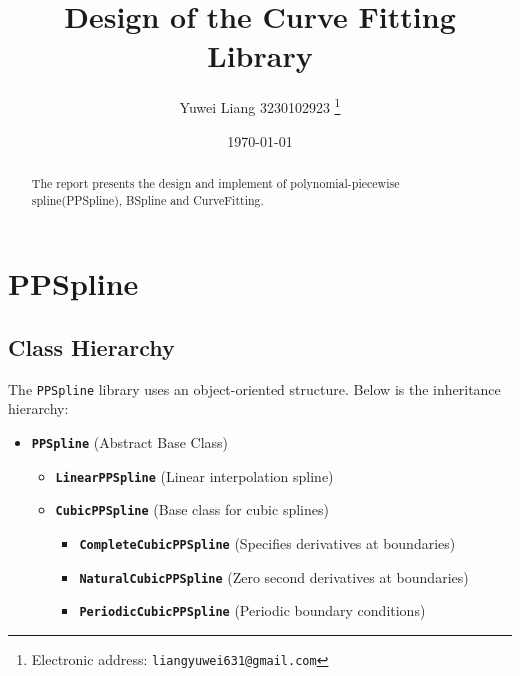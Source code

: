 \documentclass[a4paper]{article}
\begin{document}
\title{Design of the Curve Fitting Library}

\author{Yuwei Liang 3230102923
  \thanks{Electronic address: \texttt{liangyuwei631@gmail.com}}}

\date{\today}

\maketitle

\begin{abstract}
The report presents the design and implement of polynomial-piecewise spline(PPSpline), BSpline and CurveFitting.
\end{abstract}


\section{PPSpline}

\subsection{Class Hierarchy}
The \texttt{PPSpline} library uses an object-oriented structure. Below is the inheritance hierarchy:

\begin{itemize}
    \item \textbf{\texttt{PPSpline}} (Abstract Base Class)
    \begin{itemize}
        \item \textbf{\texttt{LinearPPSpline}} (Linear interpolation spline)
        \item \textbf{\texttt{CubicPPSpline}} (Base class for cubic splines)
        \begin{itemize}
            \item \textbf{\texttt{CompleteCubicPPSpline}} (Specifies derivatives at boundaries)
            \item \textbf{\texttt{NaturalCubicPPSpline}} (Zero second derivatives at boundaries)
            \item \textbf{\texttt{PeriodicCubicPPSpline}} (Periodic boundary conditions)
        \end{itemize}
    \end{itemize}
\end{itemize}
\end{document}
